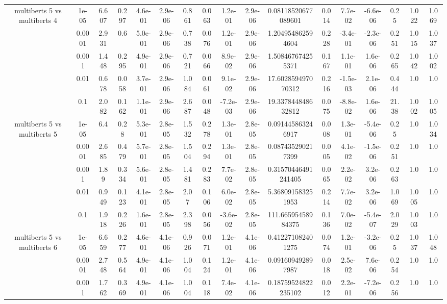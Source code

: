 \begin{tabular}{|c|c|c|c|c|c|c|c|c|c|c|c|c|c|c|c|c|}
\hline
\multirow{5}{*}{multiberts 5 vs multiberts 4} & 1e-05 & 6.607 & 0.297 & 4.6e-01 & 2.9e-06 & 0.861 & 0.063 & 1.2e-01 & 2.9e-06 & 0.08118520677089601 & 0.014 & 7.7e-02 & -6.6e-06 & 0.25 & 1.022 & 1.069 \\
 & 0.0001 & 2.931 & 0.6 & 5.0e-01 & 2.9e-06 & 0.738 & 0.076 & 1.2e-01 & 2.9e-06 & 1.204954862594604 & 0.228 & -3.4e-01 & -2.3e-06 & 0.251 & 1.015 & 1.037 \\
 & 0.001 & 1.448 & 0.295 & 4.9e-01 & 2.9e-06 & 0.721 & 0.066 & 8.9e-02 & 2.9e-06 & 1.508467674255371 & 0.167 & 1.1e-01 & 1.6e-06 & 0.265 & 1.042 & 1.002 \\
 & 0.01 & 0.678 & 0.058 & 3.7e-01 & 2.9e-06 & 1.084 & 0.061 & 9.1e-02 & 2.9e-06 & 17.602859497070312 & 0.216 & -1.5e-03 & 2.1e-06 & 0.444 & 1.0 & 1.0 \\
 & 0.1 & 2.082 & 0.162 & 1.1e-01 & 2.9e-06 & 2.687 & 0.048 & -7.2e-03 & 2.9e-06 & 19.337844848632812 & 0.075 & -8.8e-02 & 1.6e-06 & 21.38 & 1.002 & 1.005 \\
\hline
\multirow{5}{*}{multiberts 5 vs multiberts 5} & 1e-05 & 6.4 & 0.28 & 5.3e-01 & 2.8e-05 & 1.532 & 0.278 & 1.3e-01 & 2.8e-05 & 0.091445863246917 & 0.008 & 1.3e-01 & -5.4e-06 & 0.25 & 1.0 & 1.034 \\
 & 0.0001 & 2.685 & 0.479 & 5.7e-01 & 2.8e-05 & 1.504 & 0.294 & 1.3e-01 & 2.8e-05 & 0.087435290217399 & 0.005 & 4.1e-02 & -1.5e-06 & 0.251 & 1.0 & 1.0 \\
 & 0.001 & 1.89 & 0.334 & 5.6e-01 & 2.8e-05 & 1.481 & 0.283 & 7.7e-02 & 2.8e-05 & 0.31570446491241405 & 0.065 & 2.2e-02 & 3.2e-06 & 0.263 & 1.0 & 1.0 \\
 & 0.01 & 0.949 & 0.123 & 4.1e-01 & 2.8e-05 & 2.07 & 0.106 & 6.0e-02 & 2.8e-05 & 5.368091583251953 & 0.214 & 7.7e-02 & 3.2e-06 & 1.069 & 1.005 & 1.0 \\
 & 0.1 & 1.918 & 0.226 & 1.6e-01 & 2.8e-05 & 2.398 & 0.056 & -3.6e-02 & 2.8e-05 & 111.66595458984375 & 0.136 & 7.0e-02 & -5.4e-07 & 2.029 & 1.003 & 1.0 \\
\hline
\multirow{5}{*}{multiberts 5 vs multiberts 6} & 1e-05 & 6.659 & 0.277 & 4.6e-01 & 4.1e-06 & 0.926 & 0.071 & 1.2e-01 & 4.1e-06 & 0.412271082401275 & 0.074 & 1.2e-01 & -3.2e-06 & 0.25 & 1.037 & 1.048 \\
 & 0.0001 & 2.748 & 0.564 & 4.9e-01 & 4.1e-06 & 1.004 & 0.124 & 1.2e-01 & 4.1e-06 & 0.091609492897987 & 0.018 & 2.5e-02 & 7.6e-06 & 0.254 & 1.0 & 1.0 \\
 & 0.001 & 1.762 & 0.369 & 4.9e-01 & 4.1e-06 & 1.004 & 0.118 & 7.4e-02 & 4.1e-06 & 0.18759524822235102 & 0.012 & 2.2e-01 & -7.2e-06 & 0.256 & 1.0 & 1.0 \\

\end{tabular}
